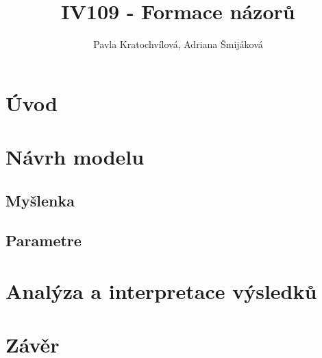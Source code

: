 \documentclass[10pt,a4paper]{report}
\author{Pavla Kratochvílová, Adriana Šmijáková}
\title{IV109 - Formace názorů}
\begin{document}
\maketitle
\chapter{Úvod}
\chapter{Návrh modelu}
\section{Myšlenka}
\section{Parametre}
\chapter{Analýza a interpretace výsledků}
\chapter{Závěr}
\end{document}

